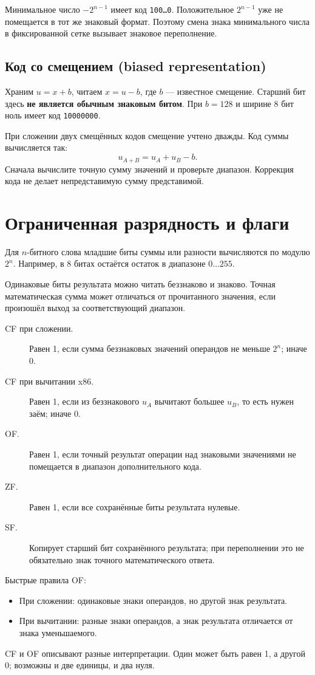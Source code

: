 Минимальное число $-2^{n-1}$ имеет код \texttt{100\ldots0}. Положительное $2^{n-1}$ уже не помещается в тот же знаковый формат. Поэтому смена знака минимального числа в фиксированной сетке вызывает знаковое переполнение.

\subsection*{Код со смещением (biased representation)}
Храним $u=x+b$, читаем $x=u-b$, где $b$ --- известное смещение. Старший бит здесь \textbf{не является обычным знаковым битом}. При $b=128$ и ширине 8 бит ноль имеет код \texttt{10000000}.

При сложении двух смещённых кодов смещение учтено дважды. Код суммы вычисляется так:
\[
u_{A+B}=u_A+u_B-b.
\]
Сначала вычислите точную сумму значений и проверьте диапазон. Коррекция кода не делает непредставимую сумму представимой.

\section{Ограниченная разрядность и флаги}
Для $n$-битного слова младшие биты суммы или разности вычисляются по модулю $2^n$. Например, в 8 битах остаётся остаток в диапазоне $0\ldots255$.

Одинаковые биты результата можно читать беззнаково и знаково. Точная математическая сумма может отличаться от прочитанного значения, если произошёл выход за соответствующий диапазон.

\begin{description}
    \item[CF при сложении.] Равен 1, если сумма беззнаковых значений операндов не меньше $2^n$; иначе 0.
    \item[CF при вычитании x86.] Равен 1, если из беззнакового $u_A$ вычитают большее $u_B$, то есть нужен заём; иначе 0.
    \item[OF.] Равен 1, если точный результат операции над знаковыми значениями не помещается в диапазон дополнительного кода.
    \item[ZF.] Равен 1, если все сохранённые биты результата нулевые.
    \item[SF.] Копирует старший бит сохранённого результата; при переполнении это не обязательно знак точного математического ответа.
\end{description}

Быстрые правила OF:
\begin{itemize}
    \item При сложении: одинаковые знаки операндов, но другой знак результата.
    \item При вычитании: разные знаки операндов, а знак результата отличается от знака уменьшаемого.
\end{itemize}
CF и OF описывают разные интерпретации. Один может быть равен 1, а другой 0; возможны и две единицы, и два нуля.

